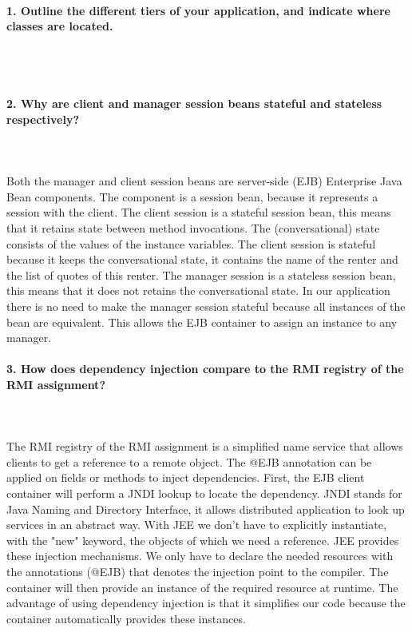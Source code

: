 \documentclass{ds-report}
\begin{document}
	\maketitle

	\paragraph{1. Outline the different tiers of your application, and indicate where classes are located.} \mbox{}\\\\




	
	\paragraph{2. Why are client and manager session beans stateful and stateless respectively?} \mbox{}\\\\
Both the manager and client session beans are server-side (EJB) Enterprise Java Bean components. The component is a session bean, because it represents a session with the client.
The client session is a stateful session bean, this means that it retains state between method invocations. The (conversational) state consists of the values of the instance variables. The client session is stateful because it keeps the conversational state, it contains the name of the renter and the list of quotes of this renter.
The manager session is a stateless session bean, this means that it does not retains the conversational state. In our application there is no need to make the manager session stateful because all instances of the bean are equivalent. This allows the EJB container to assign an instance to any manager.



	\paragraph{3. How does dependency injection compare to the RMI registry of the RMI assignment?} \mbox{}\\\\
The RMI registry of the RMI assignment is a simplified name service that allows clients to get a reference to a remote object. The @EJB annotation can be applied on fields or methods to inject dependencies. First, the EJB client container will perform a JNDI lookup to locate the dependency. JNDI stands for Java Naming and Directory Interface, it allows distributed application to look up services in an abstract way.
With JEE we don't have to explicitly instantiate, with the "new" keyword, the objects of which we need a reference. JEE provides these injection mechanisms. We only have to declare the needed resources with the annotations (@EJB) that denotes the injection point to the compiler. The container will then provide an instance of the required resource at runtime. The advantage of using dependency injection is that it simplifies our code because the container automatically provides these instances.
\end{document}
